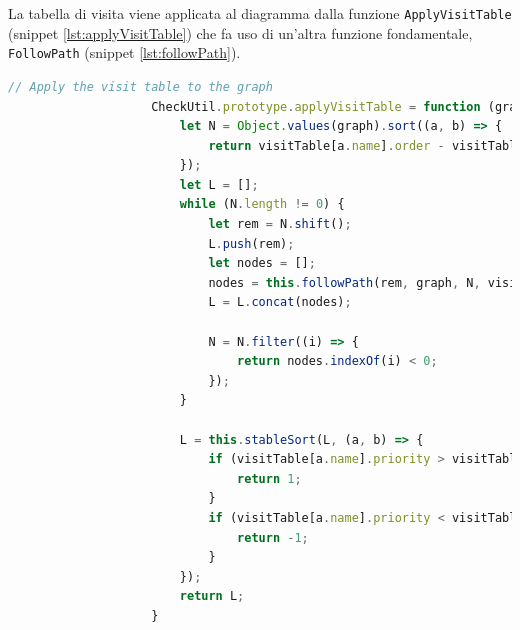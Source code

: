                 La tabella di visita viene applicata al diagramma dalla funzione \texttt{ApplyVisitTable} (snippet \ref{lst:applyVisitTable}) che fa uso di un'altra funzione fondamentale, \texttt{FollowPath} (snippet \ref{lst:followPath}).
                \newpage
                \begin{lstlisting}[language=JavaScript, basicstyle=\tiny, caption={La funzione applyVisitTable}, label={lst:applyVisitTable}]
                    // Apply the visit table to the graph
                    CheckUtil.prototype.applyVisitTable = function (graph, visitTable) {
                        let N = Object.values(graph).sort((a, b) => {
                            return visitTable[a.name].order - visitTable[b.name].order;
                        });
                        let L = [];
                        while (N.length != 0) {
                            let rem = N.shift();
                            L.push(rem);
                            let nodes = [];
                            nodes = this.followPath(rem, graph, N, visitTable, nodes);
                            L = L.concat(nodes);

                            N = N.filter((i) => {
                                return nodes.indexOf(i) < 0;
                            });
                        }

                        L = this.stableSort(L, (a, b) => {
                            if (visitTable[a.name].priority > visitTable[b.name].priority) {
                                return 1;
                            }
                            if (visitTable[a.name].priority < visitTable[b.name].priority) {
                                return -1;
                            }
                        });
                        return L;
                    }
                \end{lstlisting}

